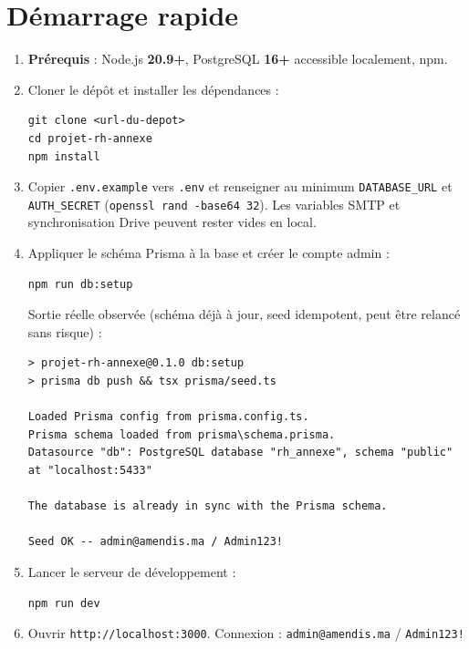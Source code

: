 \documentclass[10.5pt,a4paper]{article}
\newcommand{\mono}[1]{{\ttfamily\nolinkurl{#1}}}
\begin{document}
\section{Démarrage rapide}
\label{sec:quickstart}

\begin{enumerate}[leftmargin=1.5em, itemsep=0.3em, topsep=0.2em]
  \item \textbf{Prérequis} : Node.js \textbf{20.9+}, PostgreSQL \textbf{16+} accessible localement, npm.
  \item Cloner le dépôt et installer les dépendances :
\begin{lstlisting}
git clone <url-du-depot>
cd projet-rh-annexe
npm install
\end{lstlisting}
  \item Copier \mono{.env.example} vers \mono{.env} et renseigner au minimum
    \mono{DATABASE\_URL} et \mono{AUTH\_SECRET} (\mono{openssl rand -base64 32}).
    Les variables SMTP et synchronisation Drive peuvent rester vides en local.
  \item Appliquer le schéma Prisma à la base et créer le compte admin :
\begin{lstlisting}
npm run db:setup
\end{lstlisting}
    Sortie réelle observée (schéma déjà à jour, seed idempotent, peut être
    relancé sans risque) :
\begin{lstlisting}[backgroundcolor=\color{BrandCharcoal}, basicstyle=\ttfamily\small\color{white}, rulecolor=\color{BrandCharcoal}]
> projet-rh-annexe@0.1.0 db:setup
> prisma db push && tsx prisma/seed.ts

Loaded Prisma config from prisma.config.ts.
Prisma schema loaded from prisma\schema.prisma.
Datasource "db": PostgreSQL database "rh_annexe", schema "public" at "localhost:5433"

The database is already in sync with the Prisma schema.

Seed OK -- admin@amendis.ma / Admin123!
\end{lstlisting}
  \item Lancer le serveur de développement :
\begin{lstlisting}
npm run dev
\end{lstlisting}
  \item Ouvrir \mono{http://localhost:3000}. Connexion :
    \mono{admin@amendis.ma} / \mono{Admin123!}
\end{enumerate}
\end{document}
